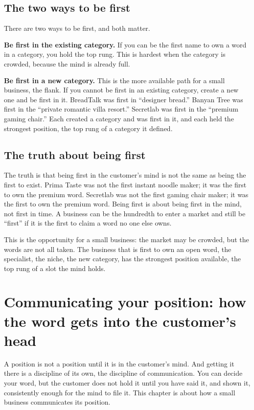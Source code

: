 \documentclass[10pt,twoside,openany]{memoir}
\newcommand{\needspacehead}{\needspace{4\baselineskip}}
\let\oldsection\section
\renewcommand{\section}{\needspacehead\oldsection}
\begin{document}
\section{The two ways to be first}\label{the-two-ways-to-be-first}

There are two ways to be first, and both matter.

\textbf{Be first in the existing category.} If you can be the first name
to own a word in a category, you hold the top rung. This is hardest when
the category is crowded, because the mind is already full.

\textbf{Be first in a new category.} This is the more available path for
a small business, the flank. If you cannot be first in an existing
category, create a new one and be first in it. BreadTalk was first in
``designer bread.'' Banyan Tree was first in the ``private romantic
villa resort.'' Secretlab was first in the ``premium gaming chair.''
Each created a category and was first in it, and each held the strongest
position, the top rung of a category it defined.

\section{The truth about being first}\label{the-truth-about-being-first}

The truth is that being first in the customer's mind is not the same as
being the first to exist. Prima Taste was not the first instant noodle
maker; it was the first to own the premium word. Secretlab was not the
first gaming chair maker; it was the first to own the premium word.
Being first is about being first in the mind, not first in time. A
business can be the hundredth to enter a market and still be ``first''
if it is the first to claim a word no one else owns.

This is the opportunity for a small business: the market may be crowded,
but the words are not all taken. The business that is first to own an
open word, the specialist, the niche, the new category, has the
strongest position available, the top rung of a slot the mind holds.

\FloatBarrier
\chapter{Communicating your position: how the word gets into the
customer's
head}\label{communicating-your-position-how-the-word-gets-into-the-customers-head}

A position is not a position until it is in the customer's mind. And
getting it there is a discipline of its own, the discipline of
communication. You can decide your word, but the customer does not hold
it until you have said it, and shown it, consistently enough for the
mind to file it. This chapter is about how a small business communicates
its position.
\end{document}

